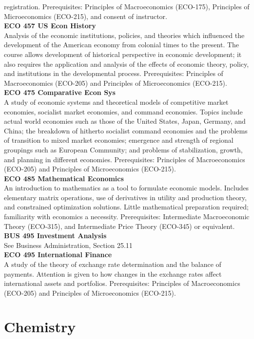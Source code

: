 \documentclass[
  letterpaper,
]{scrbook}
\begin{document}
registration. Prerequisites: Principles of Macroeconomics (ECO-175),
Principles of Microeconomics (ECO-215), and consent of instructor.\\
\textbf{ECO 457 US Econ History}\\
Analysis of the economic institutions, policies, and theories which
influenced the development of the American economy from colonial times
to the present. The course allows development of historical perspective
in economic development; it also requires the application and analysis
of the effects of economic theory, policy, and institutions in the
developmental process. Prerequisites: Principles of Macroeconomics
(ECO-205) and Principles of Microeconomics (ECO-215).\\
\textbf{ECO 475 Comparative Econ Sys}\\
A study of economic systems and theoretical models of competitive market
economies, socialist market economies, and command economies. Topics
include actual world economies such as those of the United States,
Japan, Germany, and China; the breakdown of hitherto socialist command
economies and the problems of transition to mixed market economies;
emergence and strength of regional groupings such as European Community;
and problems of stabilization, growth, and planning in different
economies. Prerequisites: Principles of Macroeconomics (ECO-205) and
Principles of Microeconomics (ECO-215).\\
\textbf{ECO 485 Mathematical Economics}\\
An introduction to mathematics as a tool to formulate economic models.
Includes elementary matrix operations, use of derivatives in utility and
production theory, and constrained optimization solutions. Little
mathematical preparation required; familiarity with economics a
necessity. Prerequisites: Intermediate Macroeconomic Theory (ECO-315),
and Intermediate Price Theory (ECO-345) or equivalent.\\
\textbf{BUS 495 Investment Analysis}\\
See Business Administration, Section 25.11\\
\textbf{ECO 495 International Finance}\\
A study of the theory of exchange rate determination and the balance of
payments. Attention is given to how changes in the exchange rates affect
international assets and portfolios. Prerequisites: Principles of
Macroeconomics (ECO-205) and Principles of Microeconomics (ECO-215).

\section{Chemistry}\label{sec-chemistry}
\end{document}
